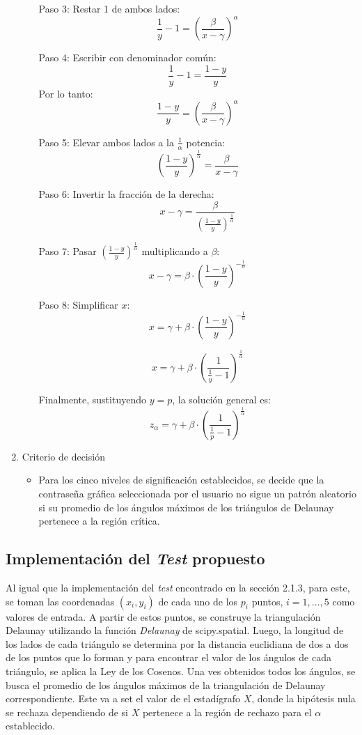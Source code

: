 \documentclass[12pt]{report}
\begin{document}
\begin{enumerate}
\begin{itemize}
		Paso 3: Restar 1 de ambos lados:
		\[
		\frac{1}{y} - 1 = \left( \frac{\beta}{x - \gamma} \right)^\alpha
		\]
		
		Paso 4: Escribir con denominador común:
		\[
		\frac{1}{y} - 1 = \frac{1 - y}{y}
		\]
		Por lo tanto:
		\[
		\frac{1 - y}{y} = \left( \frac{\beta}{x - \gamma} \right)^\alpha
		\]
		
		Paso 5: Elevar ambos lados a la \( \frac{1}{\alpha} \) potencia:
		\[
		\left( \frac{1 - y}{y} \right)^{\frac{1}{\alpha}} = \frac{\beta}{x - \gamma}
		\]
		
		Paso 6: Invertir la fracción de la derecha:
		\[
		x - \gamma = \frac{\beta}{\left( \frac{1 - y}{y} \right)^{\frac{1}{\alpha}}}
		\]
				
		Paso 7: Pasar \( \left( \frac{1 - y}{y} \right)^{\frac{1}{\alpha}} \) multiplicando a \( \beta \):
		\[
		x - \gamma = \beta \cdot \left( \frac{1 - y}{y} \right)^{-\frac{1}{\alpha}}
		\]
		
		Paso 8: Simplificar \( x \):
		\[
		x = \gamma + \beta \cdot \left( \frac{1 - y}{y} \right)^{-\frac{1}{\alpha}}
		\]
		
		\[
		x = \gamma + \beta \cdot \left( \frac{1}{\frac{1}{y}-1} \right)^{\frac{1}{\alpha}}
		\]
		
		Finalmente, sustituyendo \( y = p \), la solución general es:
		\[
		 z_\alpha = \gamma + \beta \cdot \left( \frac{1}{\frac{1}{p}-1} \right)^{\frac{1}{\alpha}}
		\]
		
		
	\end{itemize}
	\item Criterio de decisión
	\begin{itemize}
		\item Para los cinco niveles de significación establecidos, se decide que la contraseña gráfica seleccionada por el usuario no sigue un patrón aleatorio si su promedio de los ángulos máximos de los triángulos de Delaunay  pertenece a la región crítica. 
	\end{itemize}
\end{enumerate}
\subsection{Implementación del \textit{Test} propuesto }

Al igual que  la implementación del \textit{test} encontrado en la sección 2.1.3, para este, se toman las coordenadas \((x_i, y_i)\) de cada uno de los \(p_i\) puntos, \(i = 1, \ldots, 5\) como valores de entrada. A partir de estos puntos, se construye la triangulación Delaunay utilizando la función \textit{Delaunay} de scipy.spatial.
Luego, la longitud de los lados de cada triángulo se determina por la distancia euclidiana de dos a dos de los puntos que lo forman y para encontrar el valor de los ángulos de cada triángulo, se aplica la Ley de los Cosenos. Una ves obtenidos todos los ángulos, se busca el promedio de los ángulos máximos  de la triangulación de Delaunay correspondiente.  Este va a set el valor de el estadígrafo \(X\), donde la hipótesis nula se rechaza dependiendo de si  \(X\) pertenece a la región de rechazo para el \(\alpha\) establecido. 
\end{document}
